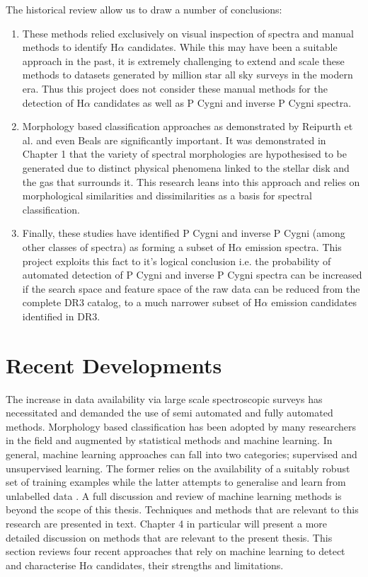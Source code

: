 The historical review allow us to draw a number of conclusions:

\begin{enumerate}
\item These methods relied exclusively on visual inspection of spectra and manual methods to identify H$\alpha$ candidates. While this may have been a suitable approach in the past, it is extremely challenging to extend and scale these methods to datasets generated by million star all sky surveys in the modern era. Thus this project does not consider these manual methods for the detection of H$\alpha$ candidates as well as P Cygni and inverse P Cygni spectra. 

\item Morphology based classification approaches as demonstrated by Reipurth et al. and even Beals are significantly important. It was demonstrated in Chapter 1 that the variety of spectral morphologies are hypothesised to be generated due to distinct physical phenomena linked to the stellar disk and the gas that surrounds it. This research leans into this approach and relies on morphological similarities and dissimilarities as a basis for spectral classification.

\item Finally, these studies have identified P Cygni and inverse P Cygni (among other classes of spectra) as forming a subset of H$\alpha$ emission spectra. This project exploits this fact to it's logical conclusion i.e. the probability of automated detection of P Cygni and inverse P Cygni spectra can be increased if the search space and feature space of the raw data can be reduced from the complete DR3 catalog, to a much narrower subset of H$\alpha$ emission candidates identified in DR3.
\end{enumerate}

\section{Recent Developments}

The increase in data availability via large scale spectroscopic surveys has necessitated and demanded the use of semi automated and fully automated methods. Morphology based classification has been adopted by many researchers in the field and augmented by statistical methods and machine learning. In general, machine learning approaches can fall into two categories; supervised and unsupervised learning. The former relies on the availability of a suitably robust set of training examples while the latter attempts to generalise and learn from unlabelled data \cite{hastie2009elements}. A full discussion and review of machine learning methods is beyond the scope of this thesis. Techniques and methods that are relevant to this research are presented in text. Chapter 4 in particular will present a more detailed discussion on methods that are relevant to the present thesis. This section reviews four recent approaches that rely on machine learning to detect and characterise H$\alpha$ candidates, their strengths and limitations.

